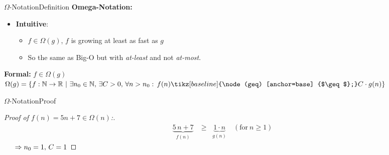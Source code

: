 \begin{frame}{$\Omega$-Notation}{Definition}
  \textbf{Omega-Notation:}
  \begin{itemize}
    \item
      \textbf{Intuitive}:\\

          \begin{itemize}
            \item
              $f \in \Omega(g)$, $f$ is growing at least as fast as $g$
            \item
              So the same as Big-O but with \textit{at-least} and not \textit{at-most}.
          \end{itemize}

  \end{itemize}
 	\begin{block}{\textbf{Formal:} $f \in \Omega(g)$}
    \begin{math}
      \Omega(g) = \lbrace f: \mathbb{N} \to \mathbb{R} ~ | ~
        \exists n_0 \in \mathbb{N}, \, \exists C > 0, \,  \forall n > n_0:\,
        f(n) \tikz[baseline] {\node (geq) [anchor=base] {$\geq$};} C \cdot g(n)\rbrace
    \end{math}
 	\end{block}
        \begin{center}
 \end{center}
\end{frame}


\begin{frame}{$\Omega$-Notation}{Proof}
  \label{slide:prooftwo}
  \begin{proof}[Proof of $f(n) = 5n + 7 \in \Omega(n)$:]
    \begin{eqnarray*}
      &\underbrace{5 \, n + 7}_{f(n)} &\geq \;\; \underbrace{1 \cdot n}_{g(n)}
      \hspace{1em} (\text{for} ~ n \geq 1)
    \end{eqnarray*}
    $\hspace{1.5em} \Rightarrow n_0 = 1, \, C = 1$ \qedhere
  \end{proof}
\end{frame}

